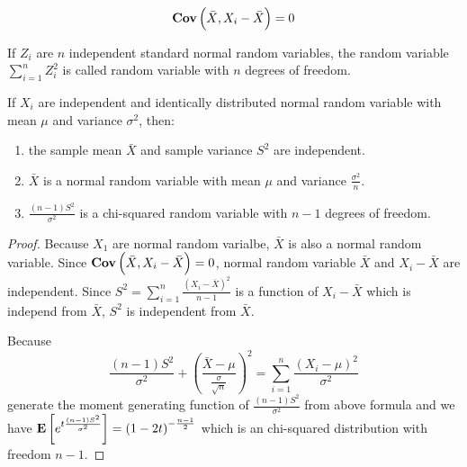 \begin{theorem}
\begin{equation}
    \mathop{\bf Cov\/}\displaystyle \left(\bar{X},X_i - \bar{X} \right) = 0
\end{equation}    
\end{theorem}



\begin{definition}
    If $Z_i$ are $n$ independent standard normal random variables, the random variable $\displaystyle \sum_{i=1}^n Z_i^2$ is called  random variable with $n$ degrees of freedom.
\end{definition}

\begin{theorem}
If $X_i$ are independent and identically distributed normal random variable with mean $\mu$ and variance $\sigma^2$, then:
    \begin{enumerate}
        \item the sample mean $\bar{X}$ and sample variance $S^2$ are independent.
        \item $\bar{X}$ is a normal random variable with mean $\mu$ and variance $\displaystyle \frac{\sigma^2}{n}$.
        \item $\displaystyle \frac{(n-1)S^2}{\sigma^2}$ is a chi-squared random variable with $n-1$ degrees of freedom.
    \end{enumerate}   
\end{theorem}

\begin{proof}
    Because $X_1$ are normal random varialbe, $\bar{X}$ is also a normal random variable. Since $\mathop{\bf Cov\/}\displaystyle \left(\bar{X},X_i - \bar{X} \right) = 0$, normal random variable $\bar{X}$ and $X_i - \bar{X}$ are independent. Since $S^2 = \displaystyle \sum_{i=1}^n \frac{(X_i - \bar{X})^2}{n -1}$ is a function of $X_i - \bar{X}$ which is independ from $\bar{X}$, $S^2$ is independent from $\bar{X}$.
    
    Because 
    \begin{equation*}
        \frac{(n-1)S^2}{\sigma^2} + \left(\frac{\bar{X} - \mu}{\frac{\sigma}{\sqrt{n}}}\right)^2 = \sum_{i=1}^n \frac{(X_i - \mu)^2}{\sigma^2}
    \end{equation*}
    generate the moment generating function of $\displaystyle \frac{(n-1)S^2}{\sigma^2}$ from above formula and we have $\mathop{\bf E\/}\displaystyle \left[ e^{t \frac{(n-1)S^2}{\sigma^2}} \right] = \left(1-2t \right)^{- \frac{n-1}{2}}$ which is an chi-squared distribution with freedom $n-1$.
\end{proof}


